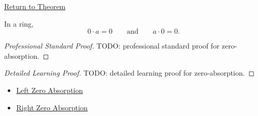 \newpage
{}
\label{prf:zero-absorption}

\begin{remark*}[Return]
\hyperref[prop:zero-absorption]{Return to Theorem}
\end{remark*}

\begin{proposition*}
In a ring,
\[
0\cdot a=0
\qquad\text{and}\qquad
a\cdot 0=0.
\]
\end{proposition*}

\begin{proof}[Professional Standard Proof]
\LRAProofBodyStart
TODO: professional standard proof for zero-absorption.
\end{proof}

\begin{proof}[Detailed Learning Proof]
\LRAProofBodyStart
TODO: detailed learning proof for zero-absorption.
\end{proof}

\begin{remark*}
\end{remark*}

\begin{dependencies}
\begin{itemize}
  \item \hyperref[prop:left-zero-absorption]{Left Zero Absorption}
  \item \hyperref[prop:right-zero-absorption]{Right Zero Absorption}
\end{itemize}
\end{dependencies}

\clearpage
